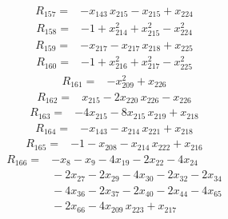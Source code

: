 \documentclass[11pt]{article}
\begin{document}
\begin{equation*}\begin{aligned}
R_{157}={}&-x_{143}\,x_{215} - x_{215} + x_{224}
\end{aligned}\end{equation*}
\begin{equation*}\begin{aligned}
R_{158}={}&-1 + x_{214}^{2} + x_{215}^{2} - x_{224}^{2}
\end{aligned}\end{equation*}
\begin{equation*}\begin{aligned}
R_{159}={}&-x_{217} - x_{217}\,x_{218} + x_{225}
\end{aligned}\end{equation*}
\begin{equation*}\begin{aligned}
R_{160}={}&-1 + x_{216}^{2} + x_{217}^{2} - x_{225}^{2}
\end{aligned}\end{equation*}
\begin{equation*}\begin{aligned}
R_{161}={}&-x_{209}^{2} + x_{226}
\end{aligned}\end{equation*}
\begin{equation*}\begin{aligned}
R_{162}={}&x_{215} - 2x_{220}\,x_{226} - x_{226}
\end{aligned}\end{equation*}
\begin{equation*}\begin{aligned}
R_{163}={}&-4x_{215} - 8x_{215}\,x_{219} + x_{218}
\end{aligned}\end{equation*}
\begin{equation*}\begin{aligned}
R_{164}={}&-x_{143} - x_{214}\,x_{221} + x_{218}
\end{aligned}\end{equation*}
\begin{equation*}\begin{aligned}
R_{165}={}&-1 - x_{208} - x_{214}\,x_{222} + x_{216}
\end{aligned}\end{equation*}
\begin{equation*}\begin{aligned}
R_{166}={}&-x_{8} - x_{9} - 4x_{19} - 2x_{22} - 4x_{24} \\
&{} - 2x_{27} - 2x_{29} - 4x_{30} - 2x_{32} - 2x_{34} \\
&{} - 4x_{36} - 2x_{37} - 2x_{40} - 2x_{44} - 4x_{65} \\
&{} - 2x_{66} - 4x_{209}\,x_{223} + x_{217}
\end{aligned}\end{equation*}
\end{document}
